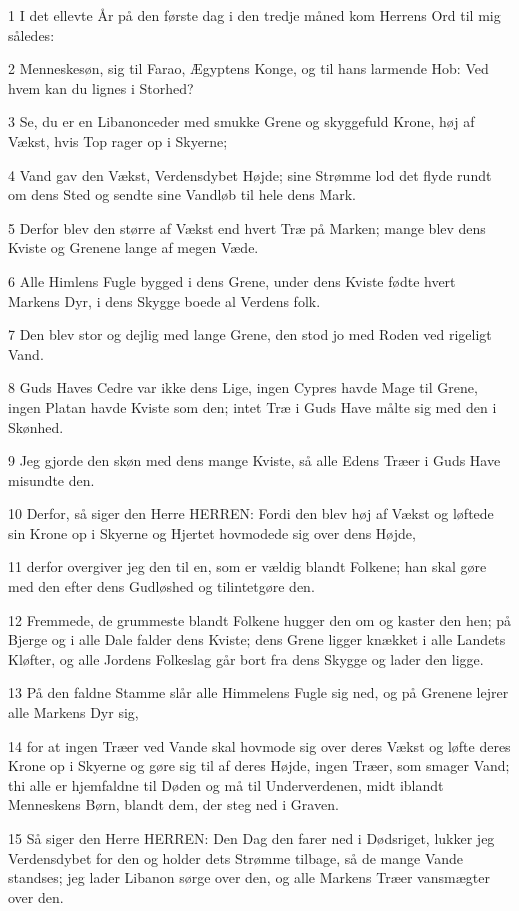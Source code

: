 \par 1 I det ellevte År på den første dag i den tredje måned kom Herrens Ord til mig således:
\par 2 Menneskesøn, sig til Farao, Ægyptens Konge, og til hans larmende Hob: Ved hvem kan du lignes i Storhed?
\par 3 Se, du er en Libanonceder med smukke Grene og skyggefuld Krone, høj af Vækst, hvis Top rager op i Skyerne;
\par 4 Vand gav den Vækst, Verdensdybet Højde; sine Strømme lod det flyde rundt om dens Sted og sendte sine Vandløb til hele dens Mark.
\par 5 Derfor blev den større af Vækst end hvert Træ på Marken; mange blev dens Kviste og Grenene lange af megen Væde.
\par 6 Alle Himlens Fugle bygged i dens Grene, under dens Kviste fødte hvert Markens Dyr, i dens Skygge boede al Verdens folk.
\par 7 Den blev stor og dejlig med lange Grene, den stod jo med Roden ved rigeligt Vand.
\par 8 Guds Haves Cedre var ikke dens Lige, ingen Cypres havde Mage til Grene, ingen Platan havde Kviste som den; intet Træ i Guds Have målte sig med den i Skønhed.
\par 9 Jeg gjorde den skøn med dens mange Kviste, så alle Edens Træer i Guds Have misundte den.
\par 10 Derfor, så siger den Herre HERREN: Fordi den blev høj af Vækst og løftede sin Krone op i Skyerne og Hjertet hovmodede sig over dens Højde,
\par 11 derfor overgiver jeg den til en, som er vældig blandt Folkene; han skal gøre med den efter dens Gudløshed og tilintetgøre den.
\par 12 Fremmede, de grummeste blandt Folkene hugger den om og kaster den hen; på Bjerge og i alle Dale falder dens Kviste; dens Grene ligger knækket i alle Landets Kløfter, og alle Jordens Folkeslag går bort fra dens Skygge og lader den ligge.
\par 13 På den faldne Stamme slår alle Himmelens Fugle sig ned, og på Grenene lejrer alle Markens Dyr sig,
\par 14 for at ingen Træer ved Vande skal hovmode sig over deres Vækst og løfte deres Krone op i Skyerne og gøre sig til af deres Højde, ingen Træer, som smager Vand; thi alle er hjemfaldne til Døden og må til Underverdenen, midt iblandt Menneskens Børn, blandt dem, der steg ned i Graven.
\par 15 Så siger den Herre HERREN: Den Dag den farer ned i Dødsriget, lukker jeg Verdensdybet for den og holder dets Strømme tilbage, så de mange Vande standses; jeg lader Libanon sørge over den, og alle Markens Træer vansmægter over den.
